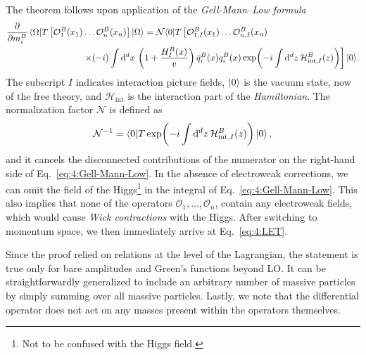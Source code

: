 The theorem follows upon application of the \textit{Gell-Mann--Low formula}
\begin{equation}
\begin{split}
&\frac{\partial}{\partial m_i^B} \braket{\Omega | T \left[ \mathcal{O}_1^B(x_1) \dots \mathcal{O}_n^B(x_n) \right] | \Omega}  = \mathcal{N}  \langle 0 | T \left[ \mathcal{O}_{1,I}^B(x_1) \dots \mathcal{O}_{n,I}^B(x_n) \right. \\
&\hspace{3cm} \left.  \times (-i) \int \dd^d x\, \left( 1 + \frac{H_I^B(x)}{v} \right) \bar{q}_{i}^B(x) q_i^B(x) \exp\!\left(-i \int \dd^d z \, \mathcal{H}_{\text{int}, I}^B(z) \right) \right] | 0 \rangle .
\end{split}
\label{eq:4:Gell-Mann-Low}
\end{equation}
The subscript $I$ indicates interaction picture fields, $\ket{0}$ is the vacuum state, now of the free theory, and $\mathcal{H}_{\text{int}}$ is the interaction part of the \textit{Hamiltonian}. The normalization factor $\mathcal{N}$ is defined as
\begin{equation}
\mathcal{N}^{-1} = \braket{0| T \exp\!\left(-i \int \mathrm{d}^d z \, \mathcal{H}_{\text{int}, I}^B (z) \right) |0},
\end{equation}
and it cancels the disconnected contributions of the numerator on the right-hand side of Eq.~\eqref{eq:4:Gell-Mann-Low}. In the absence of electroweak corrections, we can omit the field of the Higgs\footnote{Not to be confused with the Higgs field.} in the integral of Eq.~\eqref{eq:4:Gell-Mann-Low}. This also implies that none of the operators $\mathcal{O}_1, \ldots , \mathcal{O}_n$, contain any electroweak fields, which would cause \textit{Wick contractions} with the Higgs.
After switching to momentum space, we then immediately arrive at Eq.~\eqref{eq:4:LET}.

Since the proof relied on relations at the level of the Lagrangian, the statement is true only for bare amplitudes and Green's functions beyond \acs{LO}. It can be straightforwardly generalized to include an arbitrary number of massive particles by simply summing over all massive particles. Lastly, we note that the differential operator does not act on any masses present within the operators themselves.

